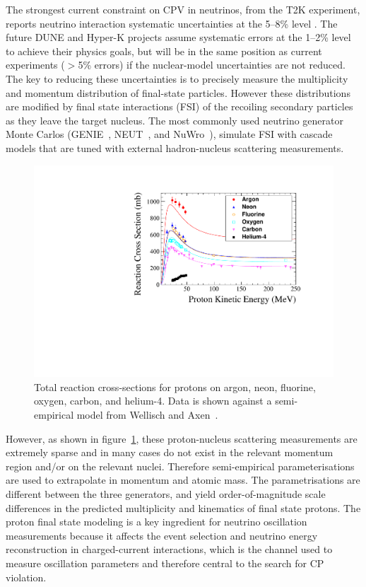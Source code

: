 The strongest current constraint on CPV in neutrinos, from the T2K experiment, reports neutrino interaction systematic uncertainties at the 5--8\% level \cite{Abe:2018wpn}.
The future DUNE and Hyper-K projects assume systematic errors at the 1--2\% level to achieve their physics goals, but will be in the same position as current experiments ($>$5\% errors) if the nuclear-model uncertainties are not reduced.  
The key to reducing these uncertainties is to precisely measure the multiplicity and momentum distribution of final-state particles. 
However these distributions are modified by final state interactions (FSI) of the recoiling secondary particles as they leave the target nucleus.  
The most commonly used neutrino generator Monte Carlos (GENIE~\cite{Andreopoulos:2009rq}, NEUT~\cite{Hayato:2009zz}, and NuWro~\cite{GOLAN2012499}), simulate FSI with cascade models that are tuned with external hadron-nucleus scattering measurements.
\begin{figure}%
    \centering
    \includegraphics[width=12cm]{files/Figures/DataProtonCrossSections.pdf}%
    \caption{Total reaction cross-sections for protons on  argon, neon, fluorine, oxygen, carbon, and helium-4. Data is shown against a semi-empirical model from Wellisch and Axen~\cite{wellisch1996total}.}
    \label{fig:DataProtonXSec}%
\end{figure}


However, as shown in figure~\ref{fig:DataProtonXSec}, these proton-nucleus scattering measurements are extremely sparse and in many cases do not exist in the relevant momentum region and/or on the relevant nuclei.
Therefore semi-empirical parameterisations are used to extrapolate in momentum and atomic mass.  
The parametrisations are different between the three generators, and yield order-of-magnitude scale differences in the predicted multiplicity and kinematics of final state protons.
The proton final state modeling is a key ingredient for neutrino oscillation measurements because it affects the event selection and neutrino energy reconstruction in charged-current interactions, which is the channel used to measure oscillation parameters and therefore central to the search for CP violation.

